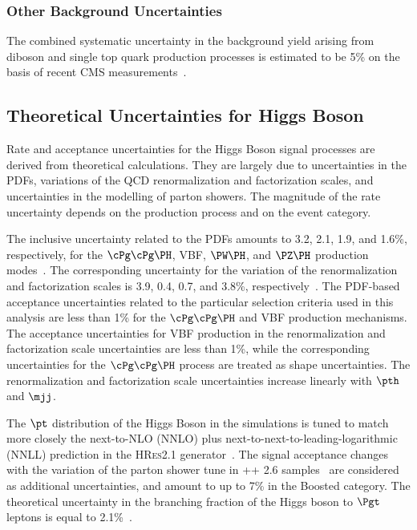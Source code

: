\subsubsection{Other Background Uncertainties}
The combined systematic uncertainty in the background yield arising from diboson and single top quark production 
processes is estimated to be 5\%
on the basis of recent CMS measurements~\cite{Khachatryan:2016tgp,Sirunyan:2016cdg}.


\subsection{Theoretical Uncertainties for Higgs Boson}
Rate and acceptance uncertainties for the Higgs Boson signal processes are derived from theoretical calculations.
They are largely due to uncertainties in the PDFs, variations of the QCD renormalization and factorization scales,
and uncertainties in the modelling of parton showers.
The magnitude of the rate uncertainty depends on the production process and on the event category.

The inclusive uncertainty related to the PDFs amounts to 3.2, 2.1, 1.9, and 1.6\%, respectively, for 
the $ \cPg\cPg\PH $, VBF, $\PW\PH$, and $\PZ\PH$ production modes~\cite{deFlorian:2016spz}. The
corresponding uncertainty for the variation of the renormalization and factorization scales is 
3.9, 0.4, 0.7, and 3.8\%, respectively~\cite{deFlorian:2016spz}.
The PDF-based acceptance uncertainties related to the particular selection criteria used in this analysis are less 
than 1\% for the $\cPg\cPg\PH$ and VBF production mechanisms. The acceptance uncertainties for VBF production 
in the renormalization and factorization scale uncertainties are less than 1\%, while the corresponding 
uncertainties for the $\cPg\cPg\PH$ process are treated as shape uncertainties. The renormalization and 
factorization scale uncertainties increase linearly with $\pth$ and $\mjj$.

The $\pt$ distribution of the Higgs Boson in the {} simulations is tuned to match more closely
the next-to-NLO (NNLO) plus next-to-next-to-leading-logarithmic (NNLL) prediction in the
\textsc{HRes2.1} generator~\cite{deFlorian:2012mx,Grazzini:2013mca}.
The signal acceptance changes with the variation of the parton shower tune in \HERWIG++ 2.6 samples~\cite{Bellm:2013hwb} 
are considered as additional uncertainties, and amount to up to 7\% in the Boosted category. The theoretical 
uncertainty in the branching fraction of the Higgs boson to $\Pgt$ leptons is equal to 2.1\%~\cite{deFlorian:2016spz}.

